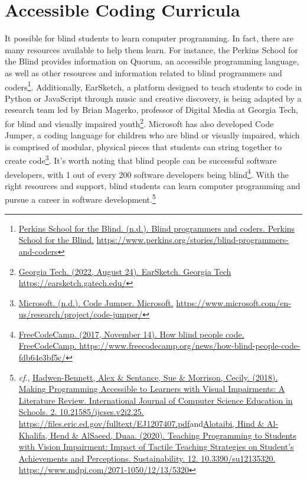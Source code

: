 \pagebreak\hypertarget{appx8}{}\section[Accessible Coding Curricula]{Accessible Coding Curricula}\label{appx8}
It possible for blind students to learn computer programming. In fact, there are many resources available to help them learn. For instance, the Perkins School for the Blind provides information on Quorum, an accessible programming language, as well as other resources and information related to blind programmers and coders\footnote{\raggedright \href{https://www.perkins.org/stories/blind-programmers-and-coders}{Perkins School for the Blind. (n.d.). Blind programmers and coders. Perkins School for the Blind.} \url{https://www.perkins.org/stories/blind-programmers-and-coders}}. Additionally, EarSketch, a platform designed to teach students to code in Python or JavaScript through music and creative discovery, is being adapted by a research team led by Brian Magerko, professor of Digital Media at Georgia Tech, for blind and visually impaired youth\footnote{\raggedright \href{https://earsketch.gatech.edu/}{Georgia Tech. (2022, August 24). EarSketch. Georgia Tech} \break\url{https://earsketch.gatech.edu/}}. Microsoft has also developed Code Jumper, a coding language for children who are blind or visually impaired, which is comprised of modular, physical pieces that students can string together to create code\footnote{\raggedright \href{https://www.microsoft.com/en-us/research/project/code-jumper/}{Microsoft. (n.d.). Code Jumper. Microsoft.} \break\url{https://www.microsoft.com/en-us/research/project/code-jumper/}}. It’s worth noting that blind people can be successful software developers, with 1 out of every 200 software developers being blind\footnote{\raggedright \href{https://www.freecodecamp.org/news/how-blind-people-code-fdb64e3bf5c/}{FreeCodeCamp. (2017, November 14). How blind people code. FreeCodeCamp. } \break\url{https://www.freecodecamp.org/news/how-blind-people-code-fdb64e3bf5c/}}. With the right resources and support, blind students can learn computer programming and pursue a career in software development.\footnote{\raggedright \textit{cf}., \href{https://files.eric.ed.gov/fulltext/EJ1207407.pdf}{Hadwen-Bennett, Alex \& Sentance, Sue \& Morrison, Cecily. (2018). Making Programming Accessible to Learners with Visual Impairments: A Literature Review. International Journal of Computer Science Education in Schools. 2. 10.21585/ijcses.v2i2.25.} \break\url{https://files.eric.ed.gov/fulltext/EJ1207407.pdf}\break and\break \href{https://www.mdpi.com/2071-1050/12/13/5320}{Alotaibi, Hind \& Al-Khalifa, Hend \& AlSaeed, Duaa. (2020). Teaching Programming to Students with Vision Impairment: Impact of Tactile Teaching Strategies on Student’s Achievements and Perceptions. Sustainability. 12. 10.3390/su12135320.} \url{https://www.mdpi.com/2071-1050/12/13/5320}}

